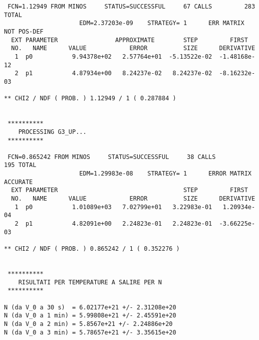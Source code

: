 {\begin{verbatim}
 FCN=1.12949 FROM MINOS     STATUS=SUCCESSFUL     67 CALLS         283 TOTAL
                     EDM=2.37203e-09    STRATEGY= 1      ERR MATRIX NOT POS-DEF
  EXT PARAMETER                APPROXIMATE        STEP         FIRST   
  NO.   NAME      VALUE            ERROR          SIZE      DERIVATIVE 
   1  p0           9.94378e+02   2.57764e+01  -5.13522e-02  -1.48168e-12
   2  p1           4.87934e+00   8.24237e-02   8.24237e-02  -8.16232e-03

** CHI2 / NDF ( PROB. ) 1.12949 / 1 ( 0.287884 )


 **********
    PROCESSING G3_UP...
 **********

 FCN=0.865242 FROM MINOS     STATUS=SUCCESSFUL     38 CALLS         195 TOTAL
                     EDM=1.29983e-08    STRATEGY= 1      ERROR MATRIX ACCURATE 
  EXT PARAMETER                                   STEP         FIRST   
  NO.   NAME      VALUE            ERROR          SIZE      DERIVATIVE 
   1  p0           1.01089e+03   7.02799e+01   3.22983e-01   1.20934e-04
   2  p1           4.82091e+00   2.24823e-01   2.24823e-01  -3.66225e-03

** CHI2 / NDF ( PROB. ) 0.865242 / 1 ( 0.352276 )


 **********
    RISULTATI PER TEMPERATURE A SALIRE PER N
 **********

N (da V_0 a 30 s)  = 6.02177e+21 +/- 2.31208e+20
N (da V_0 a 1 min) = 5.99808e+21 +/- 2.45591e+20
N (da V_0 a 2 min) = 5.8567e+21 +/- 2.24886e+20
N (da V_0 a 3 min) = 5.78657e+21 +/- 3.35615e+20
\end{verbatim}}
